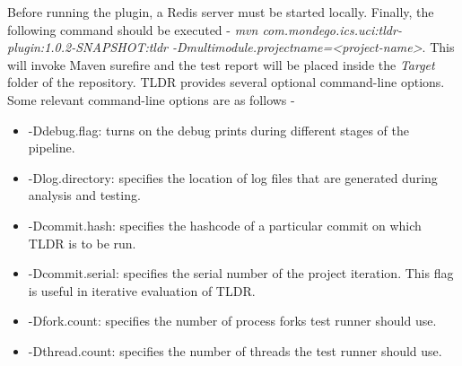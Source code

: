 Before running the plugin, a Redis server must be started locally. Finally, the following command should be executed - 
\textit{mvn com.mondego.ics.uci:tldr-plugin:1.0.2-SNAPSHOT:tldr -Dmultimodule.projectname=<project-name>}. This will invoke Maven surefire and the test report will be placed inside the \textit{Target} folder of the repository. TLDR provides several optional command-line options. Some relevant command-line options are as follows -

\begin{itemize}
    \item -Ddebug.flag: turns on the debug prints during different stages of the pipeline. 
    \item -Dlog.directory: specifies the location of log files that are generated during analysis and testing.  
    \item -Dcommit.hash: specifies the hashcode of a particular commit on which TLDR is to be run.
    \item -Dcommit.serial: specifies the serial number of the project iteration. This flag is useful in iterative evaluation of TLDR.
    \item -Dfork.count: specifies the number of process forks test runner should use. 
    \item -Dthread.count: specifies the number of threads the test runner should use. 
 \end{itemize}
